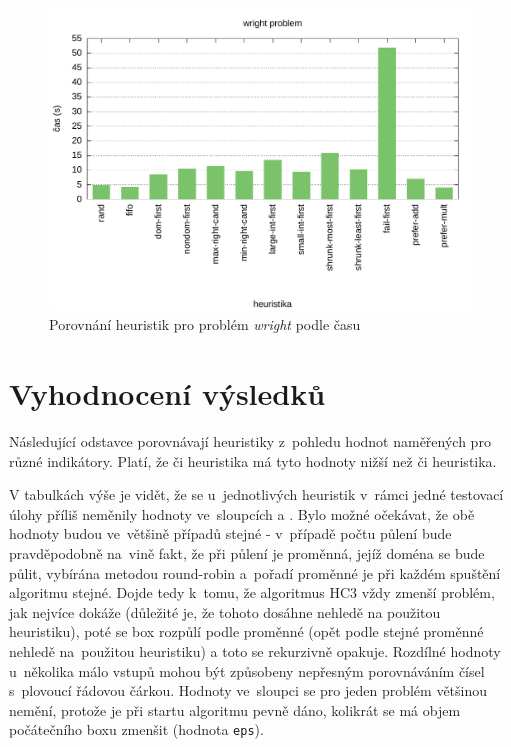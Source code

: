 {\begin{figure}[H]
\centering
\includegraphics[scale=0.68]{chart/wright_time.pdf}
\caption{Porovnání heuristik pro problém \emph{wright} podle času}
\end{figure}


\section{Vyhodnocení výsledků}
Následující odstavce porovnávají heuristiky z~pohledu hodnot naměřených pro různé indikátory. Platí, že  či  heuristika má tyto hodnoty nižší než  či  heuristika.

V tabulkách výše je vidět, že se u~jednotlivých heuristik v~rámci jedné testovací úlohy příliš neměnily hodnoty ve~sloupcích  a . Bylo možné očekávat, že obě hodnoty budou ve~většině případů stejné - v~případě počtu půlení bude pravděpodobně na~vině fakt, že při půlení je proměnná, jejíž doména se bude půlit, vybírána metodou round-robin a~pořadí proměnné je při každém spuštění algoritmu stejné. Dojde tedy k~tomu, že algoritmus HC3 vždy zmenší problém, jak nejvíce dokáže (důležité je, že tohoto dosáhne nehledě na použitou heuristiku), poté se box rozpůlí podle proměnné (opět podle stejné proměnné nehledě na~použitou heuristiku) a toto se rekurzivně opakuje. Rozdílné hodnoty u~několika málo vstupů mohou být způsobeny nepřesným porovnáváním čísel s~plovoucí řádovou čárkou. Hodnoty ve~sloupci  se pro jeden problém většinou nemění, protože je při startu algoritmu pevně dáno, kolikrát se má objem počátečního boxu zmenšit (hodnota \verb|eps|).

}
